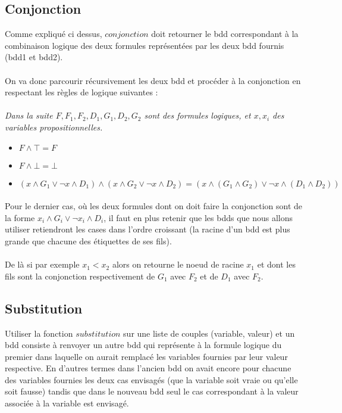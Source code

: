 \documentclass{report}
\begin{document}
	\subsection{Conjonction}
	Comme expliqué ci dessus, $conjonction$ doit retourner le bdd correspondant à la combinaison logique des deux formules représentées par les deux bdd fournis (bdd1 et bdd2).
	\paragraph{}
	On va donc parcourir récursivement les deux bdd et procéder à la conjonction en respectant les règles de logique suivantes :
	\paragraph{}
\itshape Dans la suite $F, F_1, F_2, D_1, G_1, D_2, G_2$ sont des formules logiques, et $x, x_i$ des variables propositionnelles.\upshape

	\begin{itemize}
		\item $F \wedge \top = F$
		\item $F \wedge \bot = \bot$
		\item $(x \wedge G_1 \vee \neg x \wedge D_1) \wedge (x \wedge G_2 \vee \neg x \wedge D_2) = (x \wedge (G_1 \wedge G_2) \vee \neg x \wedge (D_1 \wedge D_2))$
	\end{itemize}

	\paragraph{}
	Pour le dernier cas, où les deux formules dont on doit faire la conjonction sont de la forme $x_i \wedge G_i \vee \neg x_i \wedge D_i$, il faut en plus retenir que les bdds que nous allons utiliser retiendront les cases dans l'ordre croissant (la racine d'un bdd est plus grande que chacune des étiquettes de ses fils).
	\paragraph{}
	De là si par exemple $x_1 < x_2$ alors on retourne le noeud de racine $x_1$ et dont les fils sont la conjonction respectivement de $G_1$ avec $F_2$ et de $D_1$ avec $F_2$.

	\subsection{Substitution}
	Utiliser la fonction $substitution$ sur une liste de couples (variable, valeur) et un bdd consiste à renvoyer un autre bdd qui représente à la formule logique du premier dans laquelle on aurait remplacé les variables fournies par leur valeur respective.
	En d'autres termes dans l'ancien bdd on avait encore pour chacune des variables fournies les deux cas envisagés (que la variable soit vraie ou qu'elle soit fausse) tandis que dans le nouveau bdd seul le cas correspondant à la valeur associée à la variable est envisagé.
\end{document}
